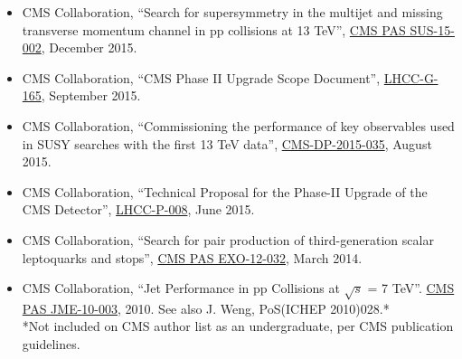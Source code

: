 \begin{itemize}[leftmargin=12pt]
\item CMS Collaboration, ``Search for supersymmetry in the multijet and missing transverse momentum channel in pp collisions at 13 TeV'', \href{http://cds.cern.ch/record/2114817}{CMS PAS SUS-15-002}, December 2015.
\fi
\item CMS Collaboration, ``CMS Phase II Upgrade Scope Document'', \href{https://cds.cern.ch/record/2055167}{LHCC-G-165}, September 2015.
\ifdefined\longestflag
\item CMS Collaboration, ``Commissioning the performance of key observables used in SUSY searches with the first 13 TeV data'', \href{https://cds.cern.ch/record/2049757}{CMS-DP-2015-035}, August 2015.
\fi
\item CMS Collaboration, ``Technical Proposal for the Phase-II Upgrade of the CMS Detector'', \href{http://cds.cern.ch/record/2020886}{LHCC-P-008}, June 2015.
\ifdefined\longestflag
\item CMS Collaboration, ``Search for pair production of third-generation scalar leptoquarks and stops'', \href{https://cds.cern.ch/record/1668411}{CMS PAS EXO-12-032}, March 2014.
\item CMS Collaboration, ``Jet Performance in pp Collisions at $\sqrt{s}$ = 7 TeV''. \href{http://cds.cern.ch/record/1279362}{CMS PAS JME-10-003}, 2010. See also J. Weng, PoS(ICHEP 2010)028.*\\
\small{*Not included on CMS author list as an undergraduate, per CMS publication guidelines.}
\fi
\end{itemize}

\ifdefined\longerflag
{}
